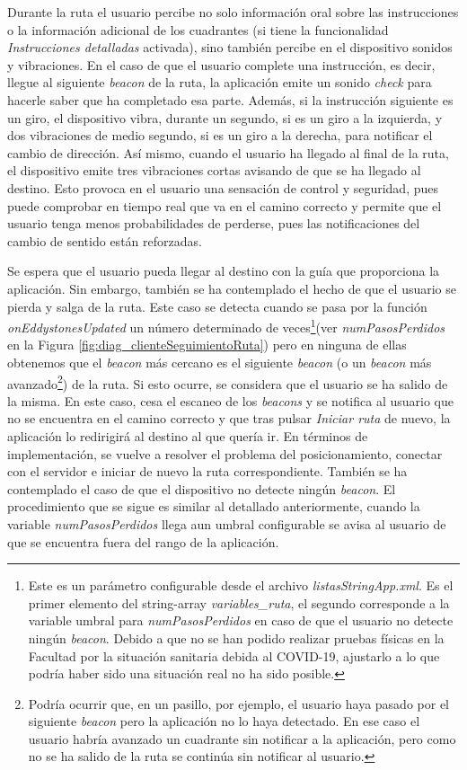 \begin{itemize}
	Durante la ruta el usuario percibe no solo información oral sobre las instrucciones o la información adicional de los cuadrantes (si tiene la funcionalidad \textit{Instrucciones detalladas} activada), sino también percibe en el dispositivo sonidos y vibraciones. En el caso de que el usuario complete una instrucción, es decir, llegue al siguiente \textit{beacon} de la ruta, la aplicación emite un sonido \textit{check} para hacerle saber que ha completado esa parte. Además, si la instrucción siguiente es un giro, el dispositivo vibra, durante un segundo, si es un giro a la izquierda, y dos vibraciones de medio segundo, si es un giro a la derecha, para notificar el cambio de dirección. Así mismo, cuando el usuario ha llegado al final de la ruta, el dispositivo emite tres vibraciones cortas avisando de que se ha llegado al destino. Esto provoca en el usuario una sensación de control y seguridad, pues puede comprobar en tiempo real que va en el camino correcto y permite que el usuario tenga menos probabilidades de perderse, pues las notificaciones del cambio de sentido están reforzadas.
	
	Se espera que el usuario pueda llegar al destino con la guía que proporciona la aplicación. Sin embargo, también se ha contemplado el hecho de que el usuario se pierda y salga de la ruta. Este caso se detecta cuando se pasa por la función \textit{onEddystonesUpdated} un número determinado de veces\footnote{Este es un parámetro configurable desde el archivo \textit{listasStringApp.xml}. Es el primer elemento del string-array \textit{variables\_ruta}, el segundo corresponde a la variable umbral para \textit{numPasosPerdidos} en caso de que el usuario no detecte ningún \textit{beacon}. Debido a que no se han podido realizar pruebas físicas en la Facultad por la situación sanitaria debida al COVID-19, ajustarlo a lo que podría haber sido una situación real no ha sido posible.}(ver \textit{numPasosPerdidos} en la Figura \ref{fig:diag_clienteSeguimientoRuta}) pero en ninguna de ellas obtenemos que el \textit{beacon} más cercano es el siguiente \textit{beacon} (o un \textit{beacon} más avanzado\footnote{Podría ocurrir que, en un pasillo, por ejemplo, el usuario haya pasado por el siguiente \textit{beacon} pero la aplicación no lo haya detectado. En ese caso el usuario habría avanzado un cuadrante sin notificar a la aplicación, pero como no se ha salido de la ruta se continúa sin notificar al usuario.}) de la ruta. Si esto ocurre, se considera que el usuario se ha salido de la misma. En este caso, cesa el escaneo de los \textit{beacons} y se notifica al usuario que no se encuentra en el camino correcto y que tras pulsar \textit{Iniciar ruta} de nuevo, la aplicación lo redirigirá al destino al que quería ir. En términos de implementación, se vuelve a resolver el problema del posicionamiento, conectar con el servidor e iniciar de nuevo la ruta correspondiente. También se ha contemplado el caso de que el dispositivo no detecte ningún \textit{beacon}. El procedimiento que se sigue es similar al detallado anteriormente, cuando la variable \textit{numPasosPerdidos} llega aun umbral configurable se avisa al usuario de que se encuentra fuera del rango de la aplicación.
	
\end{itemize}


